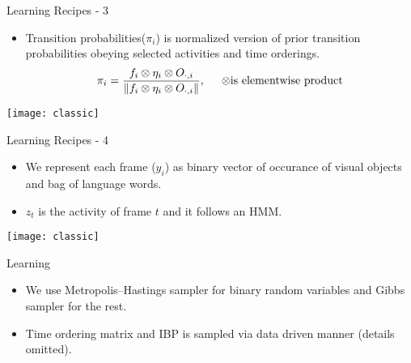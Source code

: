 \begin{frame}{Learning Recipes - 3}
\begin{itemize}
  \item Transition probabilities($\pi_i$) is normalized version of prior transition probabilities obeying selected activities and time orderings.
  \[
  \pi_i = \frac{f_i \otimes \eta_i \otimes O_{\cdot,i}}{\|f_i \otimes \eta_i \otimes O_{\cdot,i}\|}, \hspace{5mm}  \otimes \text{is elementwise product}
  \]
%
  \end{itemize}

\begin{center} \texttt{[image: classic]} \end{center}
\end{frame}


\begin{frame}{Learning Recipes - 4}
\begin{itemize}
\item We represent each frame ($y_i$) as binary vector of occurance of visual objects and bag of language words.
\item $z_t$ is the activity of frame $t$ and it follows an HMM.
\end{itemize}
\begin{center} \texttt{[image: classic]} \end{center}
\end{frame}

\begin{frame}{Learning}
  \begin{itemize}
\item We use Metropolis–Hastings sampler for binary random variables and Gibbs sampler for the rest.
\item Time ordering matrix and IBP is sampled via data driven manner (details omitted).
\end{itemize}
\end{frame}



